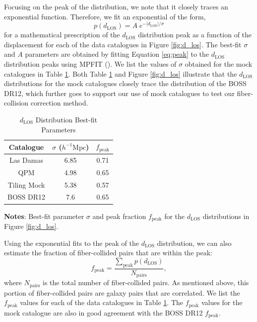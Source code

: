 \documentclass{emulateapj}
\begin{document}
Focusing on the peak of the distribution, we note that it closely traces an exponential function. Therefore, we fit an exponential of the form, 
\begin{equation} \label{eq:peak} 
p(d_{\mathrm{LOS}}) = A \; e^{-|d_{\mathrm{LOS}}|/\sigma}
\end{equation}
 for a mathematical prescription of the $d_{\mathrm{LOS}}$ distribution peak as a function of the displacement for each of the data catalogues in Figure \ref{fig:d_los}. The best-fit $\sigma$ and $A$ parameters are obtained by fitting Equation \ref{eq:peak} to the $d_{\mathrm{LOS}}$ distribution peaks using MPFIT (\citealt{Markwardt:2009aa}). We list the values of $\sigma$ obtained for the mock catalogues in Table \ref{tab:mpfit}. Both Table \ref{tab:mpfit} and Figure \ref{fig:d_los} illustrate that the $d_{\mathrm{LOS}}$ distributions for the mock catalogues closely trace the distribution of the BOSS DR12, which further goes to support our use of mock catalogues to test our fiber-collision correction method. 
 
 \begin{table} 
 \caption{$d_{\mathrm{LOS}}$ Distribution Best-fit Parameters} \label{tab:mpfit}
 \begin{spacing}{1.5}
 \begin{center}
 \leavevmode
 \begin{tabular}{ccc} \hline \hline
Catalogue &$\sigma$ ($h^{-1}\mathrm{Mpc}$) & $f_{\mathrm{peak}}$\\ \hline
Las Damas 	& 6.85	& 0.71 \\ 
QPM 		& 4.98	& 0.65 \\ 
Tiling Mock 	& 5.38	& 0.57 \\ 
BOSS DR12 	& 7.6		& 0.65 \\ \hline
\end{tabular} \par
\end{center}
\end{spacing}
{\bf Notes}: Best-fit parameter $\sigma$ and peak fraction $f_{\mathrm{peak}}$ for the $d_{\mathrm{LOS}}$ distributions in Figure \ref{fig:d_los}. 
\end{table}

Using the exponential fits to the peak of the $d_{\mathrm{LOS}}$ distribution, we can also estimate the fraction of fiber-collided pairs that are within the peak: 
\begin{equation}
f_{\mathrm{peak}} = \frac{\sum\limits_{\mathrm{peak}} p(d_{\mathrm{LOS}})}{N_{\mathrm{pairs}}}, 
\end{equation}
where $N_{\mathrm{pairs}}$ is the total number of fiber-collided pairs. As mentioned above, this portion of fiber-collided pairs are galaxy pairs that are correlated. We list the $f_{\mathrm{peak}}$ values for each of the data catalogues in Table \ref{tab:mpfit}. The $f_\mathrm{peak}$ values for the mock catalogue are also in good agreement with the BOSS DR12 $f_\mathrm{peak}$. 
\end{document}

